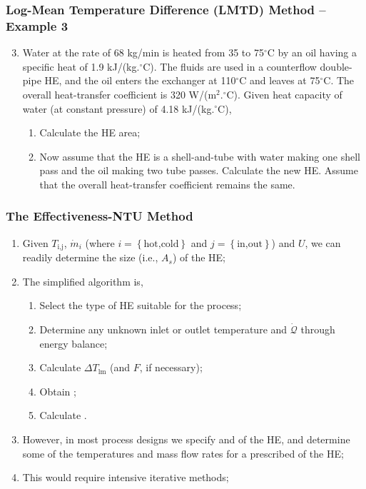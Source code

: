 \documentclass[10pt,compress,unknownkeysallowed]{beamer}
\begin{document}
\begin{frame}
  \frametitle{Log-Mean Temperature Difference (LMTD) Method -- Example 3}
     \begin{enumerate}\setcounter{enumi}{2}
         \item Water at the rate of 68 kg/min is heated from 35 to 75$^{\circ}$C by an oil having a specific heat of 1.9 kJ/(kg.$^{\circ}$C). The fluids are used in a counterflow double-pipe HE, and the oil enters the exchanger at 110$^{\circ}$C and leaves at 75$^{\circ}$C. The overall heat-transfer coefficient is 320 W/(m$^{2}.^{\circ}$C). Given heat capacity of water (at constant pressure) of 4.18 kJ/(kg.$^{\circ}$C),
            \begin{enumerate}
               \item Calculate the HE area;
               \item Now assume that the HE is a shell-and-tube with water making one shell pass and the oil making two tube passes. Calculate the new HE. Assume that the overall heat-transfer coefficient remains the same.
            \end{enumerate}
     \end{enumerate}
\end{frame}

\begin{frame}
  \frametitle{The Effectiveness-NTU Method}
     \begin{enumerate}%
          \item<1-> Given $T_{\text{i,j}}$, $\dot{m}_{i}$ (where $i = \left\{\text{hot,cold}\right\}$ and $j = \left\{\text{in,out}\right\}$) and $U$, we can readily determine the size (i.e., $A_{s}$) of the HE;
          \item<1-> The simplified algorithm is,
             \begin{enumerate}
                 \item<2-> Select the type of HE suitable for the process;
                 \item<2-> Determine any unknown inlet or outlet temperature and $\dot{\mathcal{Q}}$ through energy balance;
                 \item<2-> Calculate $\Delta T_{\text{lm}}$ (and $F$, if necessary);
                 \item<2-> Obtain ;
                 \item<2-> Calculate . 
             \end{enumerate}
          \item<4-> However, in most process designs we specify  and  of the HE, and determine some of the temperatures and mass flow rates for a prescribed  of the HE;
          \item<5-> This would require intensive iterative methods;
     \end{enumerate}

\end{frame}
\end{document}
